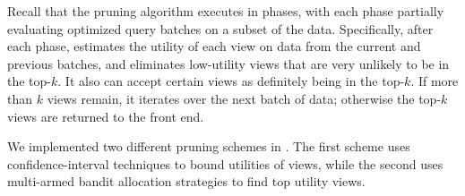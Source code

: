 \label{sec:basic_framework}
Recall that the pruning algorithm executes in phases, with each phase partially 
evaluating optimized query batches
on a subset of the data.
Specifically, after each phase, \SeeDB estimates the utility of each view on 
data from the current and previous batches, and eliminates
low-utility views that are very unlikely to be in the top-$k$.  
It also can accept certain views as definitely being in the top-$k$.
If more than $k$ views remain, it iterates over the next batch of data;  
otherwise the top-$k$ views are returned to the front end.

We implemented two different pruning schemes in \SeeDB.
The first scheme uses  confidence-interval
techniques to bound utilities of views, while the second uses
multi-armed bandit allocation strategies to find top utility views.


